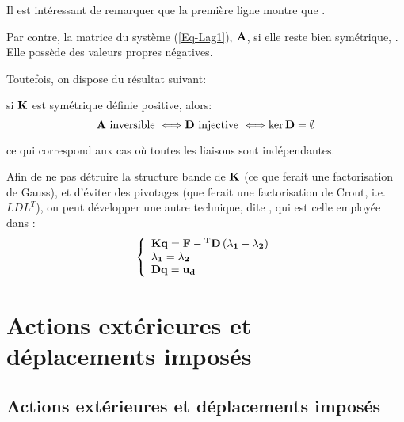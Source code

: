 Il est intéressant de remarquer que la première ligne montre que .

Par contre, la matrice du système (\ref{Eq-Lag1}), $\mathbf{A}$, si elle reste bien symétrique, . Elle possède des valeurs propres négatives.

\medskip
Toutefois, on dispose du résultat suivant:
\begin{theoreme}
si $\mathbf{K}$ est symétrique définie positive, alors:
\begin{equation}
\mathbf{A} \text{ inversible } \Longleftrightarrow \mathbf{D} \text{ injective } \Longleftrightarrow \ker \mathbf{D} = \emptyset
\end{equation}
\end{theoreme}
ce qui correspond aux cas où toutes les liaisons sont indépendantes.

\bigskip
Afin de ne pas détruire la structure bande de $\mathbf{K}$ (ce que ferait une factorisation de Gauss), 
et d'éviter des pivotages (que ferait une factorisation de Crout, i.e. $LDL^T$), on peut développer une autre technique, dite , qui est celle employée dans \castem:
\begin{equation}
\left\{\begin{array}{l}
\mathbf{K}\mathbf{q} = \mathbf{F} - {}^\mathrm{T}\mathbf{D}\left(\mathbf{\lambda_1} - \mathbf{\lambda_2}\right) \\
\mathbf{\lambda_1} = \mathbf{\lambda_2} \\ 
\mathbf{D}\mathbf{q} = \mathbf{u_d}
\end{array}\right.
\end{equation}





\medskip
\ifVersionAvecExemplesSepares
   \section{Actions extérieures et déplacements imposés}
\else
   \subsection{Actions extérieures et déplacements imposés}
\fi

